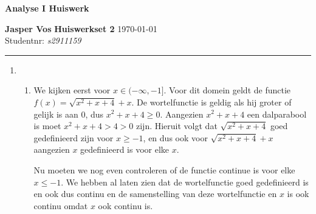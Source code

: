 \documentclass{article}
\begin{document}
{\Large \textbf{Analyse I Huiswerk}}

\bigskip

\textbf{Jasper Vos} \hfill \textbf{Huiswerkset 2} \hfill \today \\
Studentnr: \emph{s2911159} 

\rule{\textwidth}{2pt}

\bigskip

\begin{enumerate}
    \item
    \begin{enumerate}[label=\alph*)]
        \item 
        We kijken eerst voor $x \in (-\infty, -1 ]$. 
        Voor dit domein geldt de functie $f(x) = \sqrt{x^2 +x + 4} + x$. 
        De wortelfunctie is geldig als hij groter of gelijk is aan 0, dus $x^2 + x + 4 \geq 0$.
        Aangezien $x^2 + x + 4$ een dalparabool is moet $x^2 + x + 4 > 4 > 0$ zijn.
        Hieruit volgt dat $\sqrt{x^2 + x + 4}$ goed gedefinieerd zijn voor $x \geq -1$, en dus 
        ook voor $\sqrt{x^2 + x + 4} + x$ aangezien $x$ gedefinieerd is voor elke $x$. 

        Nu moeten we nog even controleren of de functie continue is voor 
        elke $x\leq-1$. We hebben al laten zien dat de wortelfunctie goed gedefinieerd is en ook dus continu en de samenstelling van deze wortelfunctie en $x$ is ook continu omdat $x$ ook continu is.
    \end{enumerate}
\end{enumerate}
\end{document}
